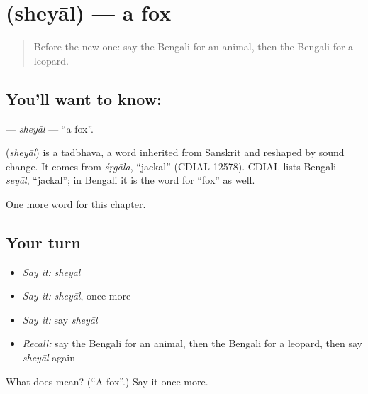 \section[\texorpdfstring{\bn{শেয়াল} (sheyāl)}{শেয়াল (sheyāl)}]{ (sheyāl) — a fox}

\label{lesson:BN-C224-sheyal}



\begin{quote}
Before the new one: say the Bengali for an animal, then the Bengali for a leopard.
\end{quote}

\subsection*{You'll want to know: }
\textbf{} — \emph{sheyāl} — \textquotedblleft{}a fox\textquotedblright{}.

\begin{cousinweb}
\textbf{} (\emph{sheyāl}) is a tadbhava, a word inherited from Sanskrit and reshaped by sound change. It comes from \emph{śṛgāla}, \textquotedblleft{}jackal\textquotedblright{} (CDIAL 12578). CDIAL lists Bengali \emph{seyāl}, \textquotedblleft{}jackal\textquotedblright{}; in Bengali it is the word for \textquotedblleft{}fox\textquotedblright{} as well.
\end{cousinweb}

\begin{grammarlens}[title={What you've built}]
One more word for this chapter.
\end{grammarlens}

\subsection*{Your turn}
\begin{itemize}
\raggedright
  \item \emph{Say it:} \emph{sheyāl}
  \item \emph{Say it:} \emph{sheyāl}, once more
  \item \emph{Say it:} say \emph{sheyāl}
  \item \emph{Recall:} say the Bengali for an animal, then the Bengali for a leopard, then say \emph{sheyāl} again
\end{itemize}

\begin{tcolorbox}[breakable,colback=teal!4,colframe=teal!35!black,title={Before you move on}]
What does  mean? (\textquotedblleft{}A fox\textquotedblright{}.) Say it once more.
\end{tcolorbox}
